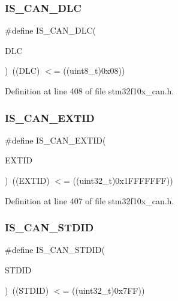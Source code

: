 \subsubsection{\texorpdfstring{I\+S\+\_\+\+C\+A\+N\+\_\+\+D\+LC}{IS\_CAN\_DLC}}
{\footnotesize\ttfamily \#define I\+S\+\_\+\+C\+A\+N\+\_\+\+D\+LC(\begin{DoxyParamCaption}\item[{}]{D\+LC }\end{DoxyParamCaption})~((D\+LC) $<$= ((uint8\+\_\+t)0x08))}



Definition at line 408 of file stm32f10x\+\_\+can.\+h.

\mbox{\label{group___c_a_n___tx_ga62dbc2163ad6751b3f921e717b00e9f2}} 
\subsubsection{\texorpdfstring{I\+S\+\_\+\+C\+A\+N\+\_\+\+E\+X\+T\+ID}{IS\_CAN\_EXTID}}
{\footnotesize\ttfamily \#define I\+S\+\_\+\+C\+A\+N\+\_\+\+E\+X\+T\+ID(\begin{DoxyParamCaption}\item[{}]{E\+X\+T\+ID }\end{DoxyParamCaption})~((E\+X\+T\+ID) $<$= ((uint32\+\_\+t)0x1\+F\+F\+F\+F\+F\+F\+F))}



Definition at line 407 of file stm32f10x\+\_\+can.\+h.

\mbox{\label{group___c_a_n___tx_gaf059e4383fa69dec6e18216b22a87f51}} 
\subsubsection{\texorpdfstring{I\+S\+\_\+\+C\+A\+N\+\_\+\+S\+T\+D\+ID}{IS\_CAN\_STDID}}
{\footnotesize\ttfamily \#define I\+S\+\_\+\+C\+A\+N\+\_\+\+S\+T\+D\+ID(\begin{DoxyParamCaption}\item[{}]{S\+T\+D\+ID }\end{DoxyParamCaption})~((S\+T\+D\+ID) $<$= ((uint32\+\_\+t)0x7\+F\+F))}



